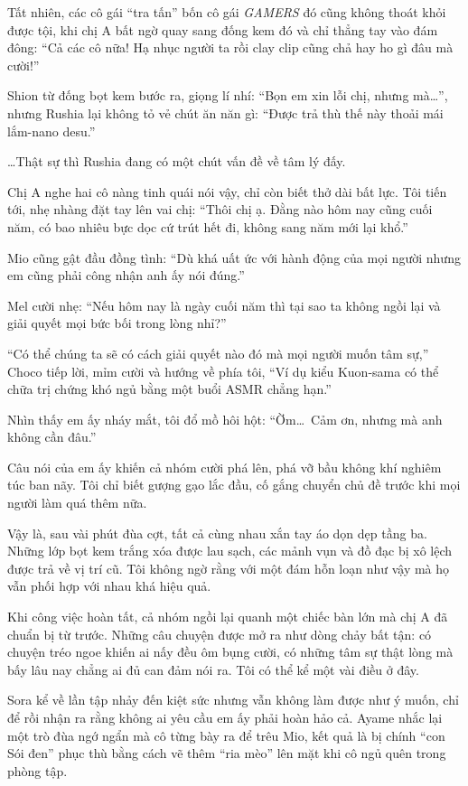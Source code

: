\documentclass[../main.tex]{subfiles}
\begin{document}
Tất nhiên, các cô gái ``tra tấn'' bốn cô gái \textit{GAMERS} đó cũng không thoát khỏi được tội, khi chị A bất ngờ quay sang đống kem đó và chỉ thẳng tay vào đám đông: ``Cả các cô nữa! Hạ nhục người ta rồi clay clip cũng chả hay ho gì đâu mà cười!''

Shion từ đống bọt kem bước ra, giọng lí nhí: ``Bọn em xin lỗi chị, nhưng mà\dots'', nhưng Rushia lại không tỏ vẻ chút ăn năn gì: ``Được trả thù thế này thoải mái lắm-nano desu.''

\dots Thật sự thì Rushia đang có một chút vấn đề về tâm lý đấy.

Chị A nghe hai cô nàng tinh quái nói vậy, chỉ còn biết thở dài bất lực. Tôi tiến tới, nhẹ nhàng đặt tay lên vai chị: ``Thôi chị ạ. Đằng nào hôm nay cũng cuối năm, có bao nhiêu bực dọc cứ trút hết đi, không sang năm mới lại khổ.''

Mio cũng gật đầu đồng tình: ``Dù khá uất ức với hành động của mọi người nhưng em cũng phải công nhận anh ấy nói đúng.''

Mel cười nhẹ: ``Nếu hôm nay là ngày cuối năm thì tại sao ta không ngồi lại và giải quyết mọi bức bối trong lòng nhỉ?''

``Có thể chúng ta sẽ có cách giải quyết nào đó mà mọi người muốn tâm sự,'' Choco tiếp lời, mỉm cười và hướng về phía tôi, ``Ví dụ kiểu Kuon-sama có thể chữa trị chứng khó ngủ bằng một buổi ASMR chẳng hạn.''

Nhìn thấy em ấy nháy mắt, tôi đổ mồ hôi hột: ``Ờm\dots\ Cảm ơn, nhưng mà anh không cần đâu.''

Câu nói của em ấy khiến cả nhóm cười phá lên, phá vỡ bầu không khí nghiêm túc ban nãy. Tôi chỉ biết gượng gạo lắc đầu, cố gắng chuyển chủ đề trước khi mọi người làm quá thêm nữa.

\ct

Vậy là, sau vài phút đùa cợt, tất cả cùng nhau xắn tay áo dọn dẹp tầng ba. Những lớp bọt kem trắng xóa được lau sạch, các mảnh vụn và đồ đạc bị xô lệch được trả về vị trí cũ. Tôi không ngờ rằng với một đám hỗn loạn như vậy mà họ vẫn phối hợp với nhau khá hiệu quả.

Khi công việc hoàn tất, cả nhóm ngồi lại quanh một chiếc bàn lớn mà chị A đã chuẩn bị từ trước. Những câu chuyện được mở ra như dòng chảy bất tận: có chuyện tréo ngoe khiến ai nấy đều ôm bụng cười, có những tâm sự thật lòng mà bấy lâu nay chẳng ai đủ can đảm nói ra. Tôi có thể kể một vài điều ở đây.

Sora kể về lần tập nhảy đến kiệt sức nhưng vẫn không làm được như ý muốn, chỉ để rồi nhận ra rằng không ai yêu cầu em ấy phải hoàn hảo cả. Ayame nhắc lại một trò đùa ngớ ngẩn mà cô từng bày ra để trêu Mio, kết quả là bị chính ``con Sói đen'' phục thù bằng cách vẽ thêm ``ria mèo'' lên mặt khi cô ngủ quên trong phòng tập.
\end{document}
